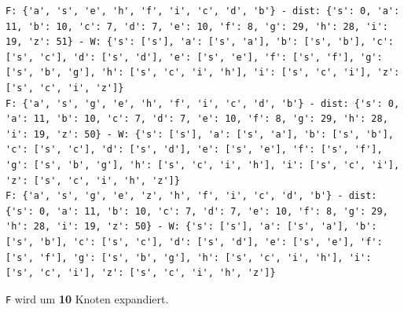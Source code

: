 \documentclass[a4paper,11pt]{report}
\begin{document}
\begin{verbatim}
F: {'a', 's', 'e', 'h', 'f', 'i', 'c', 'd', 'b'} - dist: {'s': 0, 'a': 11, 'b': 10, 'c': 7, 'd': 7, 'e': 10, 'f': 8, 'g': 29, 'h': 28, 'i': 19, 'z': 51} - W: {'s': ['s'], 'a': ['s', 'a'], 'b': ['s', 'b'], 'c': ['s', 'c'], 'd': ['s', 'd'], 'e': ['s', 'e'], 'f': ['s', 'f'], 'g': ['s', 'b', 'g'], 'h': ['s', 'c', 'i', 'h'], 'i': ['s', 'c', 'i'], 'z': ['s', 'c', 'i', 'z']}
F: {'a', 's', 'g', 'e', 'h', 'f', 'i', 'c', 'd', 'b'} - dist: {'s': 0, 'a': 11, 'b': 10, 'c': 7, 'd': 7, 'e': 10, 'f': 8, 'g': 29, 'h': 28, 'i': 19, 'z': 50} - W: {'s': ['s'], 'a': ['s', 'a'], 'b': ['s', 'b'], 'c': ['s', 'c'], 'd': ['s', 'd'], 'e': ['s', 'e'], 'f': ['s', 'f'], 'g': ['s', 'b', 'g'], 'h': ['s', 'c', 'i', 'h'], 'i': ['s', 'c', 'i'], 'z': ['s', 'c', 'i', 'h', 'z']}
F: {'a', 's', 'g', 'e', 'z', 'h', 'f', 'i', 'c', 'd', 'b'} - dist: {'s': 0, 'a': 11, 'b': 10, 'c': 7, 'd': 7, 'e': 10, 'f': 8, 'g': 29, 'h': 28, 'i': 19, 'z': 50} - W: {'s': ['s'], 'a': ['s', 'a'], 'b': ['s', 'b'], 'c': ['s', 'c'], 'd': ['s', 'd'], 'e': ['s', 'e'], 'f': ['s', 'f'], 'g': ['s', 'b', 'g'], 'h': ['s', 'c', 'i', 'h'], 'i': ['s', 'c', 'i'], 'z': ['s', 'c', 'i', 'h', 'z']}
    \end{verbatim}

    \texttt{F} wird um \textbf{10} Knoten expandiert.
\end{document}
